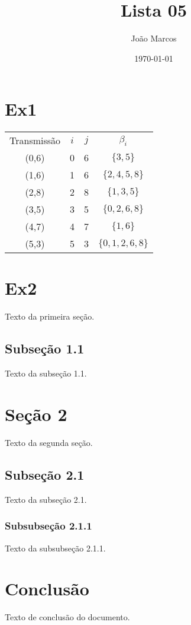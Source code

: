 \documentclass{article} %
\begin{document}
	
	\title{Lista 05} 
	\author{João Marcos}
	\date{\today}
	
	\maketitle %
	
	\section{Ex1} %
	\begin{tabular}{c c c c} 
		Transmissão & $i$ & $j$ & $\beta_i$ \\ 
		(0,6) & 0 & 6 & $\{3, 5\}$ \\
		\hline 
		(1,6) & 1 & 6 & $\{2, 4, 5, 8\}$ \\
		\hline 
		(2,8) & 2 & 8 & $\{1, 3, 5\}$ \\ 
		\hline 
		(3,5) & 3 & 5 & $\{0, 2, 6, 8\}$ \\ 
		\hline 
		(4,7) & 4 & 7 & $\{1, 6\}$ \\
		\hline 
		(5,3) & 5 & 3 & $\{0, 1, 2, 6, 8\}$ \\
	\end{tabular} %
	
	\section{Ex2} %
	Texto da primeira seção.
	
	\subsection{Subseção 1.1} %
	Texto da subseção 1.1.
	
	\section{Seção 2} %
	Texto da segunda seção.
	
	\subsection{Subseção 2.1} %
	Texto da subseção 2.1.
	
	\subsubsection{Subsubseção 2.1.1} %
	Texto da subsubseção 2.1.1.
	
	\section{Conclusão} %
	Texto de conclusão do documento.
	
\end{document}
